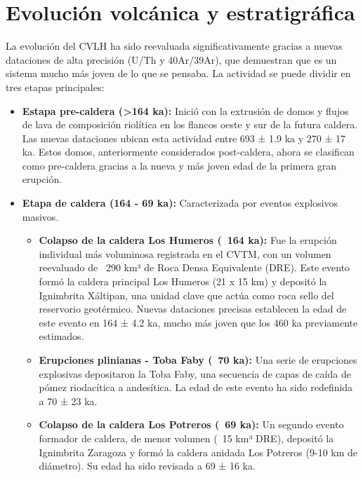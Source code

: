 \section{Evolución volcánica y estratigráfica}
La evolución del CVLH ha sido reevaluada significativamente gracias a nuevas dataciones de alta precisión (U/Th y 40Ar/39Ar), que demuestran que es un sistema mucho más joven de lo que se pensaba. La actividad se puede dividir en tres etapas principales:
\begin{itemize}
    \item \textbf{Estapa pre-caldera (>164 ka):} Inició con la extrusión de domos y flujos de lava de composición riolítica en los flancos oeste y sur de la futura caldera. Las nuevas dataciones ubican esta actividad entre 693 ± 1.9 ka y 270 ± 17 ka. Estos domos, anteriormente considerados post-caldera, ahora se clasifican como pre-caldera gracias a la nueva y más joven edad de la primera gran erupción.
    \item \textbf{Etapa de caldera (164 - 69 ka):} Caracterizada por eventos explosivos masivos.
    \begin{itemize}
        \item \textbf{Colapso de la caldera Los Humeros (~164 ka):}  Fue la erupción individual más voluminosa registrada en el CVTM, con un volumen reevaluado de ~290 km³ de Roca Densa Equivalente (DRE). Este evento formó la caldera principal Los Humeros (21 x 15 km) y depositó la Ignimbrita Xáltipan, una unidad clave que actúa como roca sello del reservorio geotérmico. Nuevas dataciones precisas establecen la edad de este evento en 164 ± 4.2 ka, mucho más joven que los 460 ka previamente estimados.
        \item \textbf{Erupciones plinianas - Toba Faby (~70 ka):} Una serie de erupciones explosivas depositaron la Toba Faby, una secuencia de capas de caída de pómez riodacítica a andesítica. La edad de este evento ha sido redefinida a 70 ± 23 ka.
        \item \textbf{Colapso de la caldera Los Potreros (~69 ka):}  Un segundo evento formador de caldera, de menor volumen (~15 km³ DRE), depositó la Ignimbrita Zaragoza y formó la caldera anidada Los Potreros (9-10 km de diámetro). Su edad ha sido revisada a 69 ± 16 ka.
    \end{itemize}


\end{itemize}
